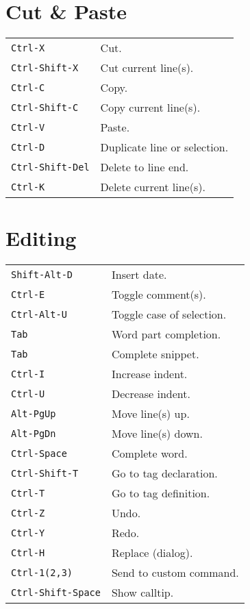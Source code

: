 \begin{multicols}{3}
	\section{Cut \& Paste}
	\begin{tabular}{@{}ll@{}}
		\verb!Ctrl-X!         & Cut.                         \\
		\verb!Ctrl-Shift-X!   & Cut current line(s).         \\
		\verb!Ctrl-C!         & Copy.                        \\
		\verb!Ctrl-Shift-C!   & Copy current line(s).        \\
		\verb!Ctrl-V!         & Paste.                       \\
		\verb!Ctrl-D!         & Duplicate line or selection. \\
		\verb!Ctrl-Shift-Del! & Delete to line end.          \\
		\verb!Ctrl-K!         & Delete current line(s).      \\
	\end{tabular}

	\section{Editing}
	\begin{tabular}{@{}ll@{}}
		\verb!Shift-Alt-D!      & Insert date.              \\
		\verb!Ctrl-E!           & Toggle comment(s).        \\
		\verb!Ctrl-Alt-U!       & Toggle case of selection. \\
		\verb!Tab!              & Word part completion.     \\
		\verb!Tab!              & Complete snippet.         \\
		\verb!Ctrl-I!           & Increase indent.          \\
		\verb!Ctrl-U!           & Decrease indent.          \\
		\verb!Alt-PgUp!         & Move line(s) up.          \\
		\verb!Alt-PgDn!         & Move line(s) down.        \\
		\verb!Ctrl-Space!       & Complete word.            \\
		\verb!Ctrl-Shift-T!     & Go to tag declaration.    \\
		\verb!Ctrl-T!           & Go to tag definition.     \\
		\verb!Ctrl-Z!           & Undo.                     \\
		\verb!Ctrl-Y!           & Redo.                     \\
		\verb!Ctrl-H!           & Replace (dialog).         \\
		\verb!Ctrl-1(2,3)!      & Send to custom command.   \\
		\verb!Ctrl-Shift-Space! & Show calltip.             \\
	\end{tabular}


\end{multicols}
